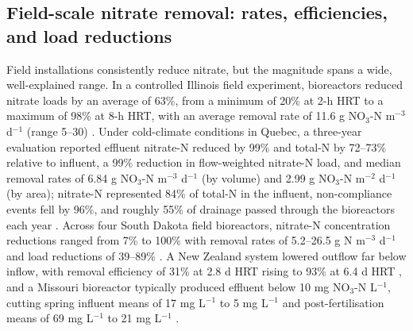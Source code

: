 \subsection{Field-scale nitrate removal: rates, efficiencies, and load reductions}

Field installations consistently reduce nitrate, but the magnitude spans a wide, well-explained range. In a controlled Illinois field experiment, bioreactors reduced nitrate loads by an average of 63\%, from a minimum of 20\% at 2-h HRT to a maximum of 98\% at 8-h HRT, with an average removal rate of 11.6 g NO$_3$-N m$^{-3}$ d$^{-1}$ (range 5--30) \parencite{Bell2015}. Under cold-climate conditions in Quebec, a three-year evaluation reported effluent nitrate-N reduced by 99\% and total-N by 72--73\% relative to influent, a 99\% reduction in flow-weighted nitrate-N load, and median removal rates of 6.84 g NO$_3$-N m$^{-3}$ d$^{-1}$ (by volume) and 2.99 g NO$_3$-N m$^{-2}$ d$^{-1}$ (by area); nitrate-N represented 84\% of total-N in the influent, non-compliance events fell by 96\%, and roughly 55\% of drainage passed through the bioreactors each year \parencite{Husk2017}. Across four South Dakota field bioreactors, nitrate-N concentration reductions ranged from 7\% to 100\% with removal rates of 5.2--26.5 g N m$^{-3}$ d$^{-1}$ and load reductions of 39--89\% \parencite{Thapa2023}. A New Zealand system lowered outflow far below inflow, with removal efficiency of 31\% at 2.8 d HRT rising to 93\% at 6.4 d HRT \parencite{Rivas2020}, and a Missouri bioreactor typically produced effluent below 10 mg NO$_3$-N L$^{-1}$, cutting spring influent means of 17 mg L$^{-1}$ to 5 mg L$^{-1}$ and post-fertilisation means of 69 mg L$^{-1}$ to 21 mg L$^{-1}$ \parencite{Aide2016}.

